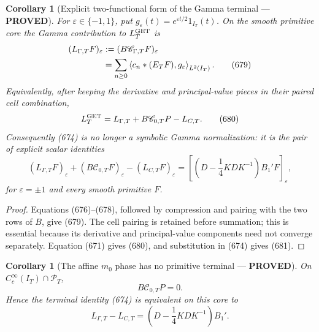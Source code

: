 \documentclass[11pt]{article}
\newtheorem{corollary}[theorem]{Corollary}
\newcommand{\PROVED}{\textcolor{green!45!black}{\textbf{PROVED}}}
\begin{document}
\begin{corollary}[Explicit two-functional form of the Gamma terminal ---
\PROVED]
For \(\varepsilon\in\{-1,1\}\), put
\(g_\varepsilon(t)=e^{\varepsilon t/2}1_{I_T}(t)\).  On the smooth
primitive core the Gamma contribution to \(L_T^{\rm GET}\) is
\begin{align}
 (L_{\Gamma,T}F)_\varepsilon
 &:=(B\mathscr C_{\Gamma,T}F)_\varepsilon\notag\\
 &=\sum_{n\ge0}
   \left\langle
    c_n*(E_TF),g_\varepsilon
   \right\rangle_{L^2(I_T)}.                         \tag{679}
\end{align}
Equivalently, after keeping the derivative and principal-value pieces in
their paired cell combination,
\begin{equation}
 L_T^{\rm GET}
 =L_{\Gamma,T}+B\mathscr C_{0,T}P-L_{C,T}.           \tag{680}
\end{equation}
Consequently (674) is no longer a symbolic Gamma normalization: it is the
pair of explicit scalar identities
\begin{equation}
 \boxed{
 (L_{\Gamma,T}F)_\varepsilon+
 (B\mathscr C_{0,T}F)_\varepsilon-
 (L_{C,T}F)_\varepsilon
 =
 \left[
 \left(D-\frac14KDK^{-1}\right)B_1'F
 \right]_\varepsilon,}                              \tag{681}
\end{equation}
for \(\varepsilon=\pm1\) and every smooth primitive \(F\).
\end{corollary}

\begin{proof}
Equations (676)--(678), followed by compression and pairing with the two
rows of \(B\), give (679).  The cell pairing is retained before summation;
this is essential because its derivative and principal-value components
need not converge separately.  Equation (671) gives (680), and substitution
in (674) gives (681).
\end{proof}

\begin{corollary}[The affine \(m_0\) phase has no primitive terminal ---
\PROVED]
On \(C_c^\infty(I_T)\cap\mathcal P_T\),
\begin{equation}
 B\mathscr C_{0,T}P=0.                               \tag{682}
\end{equation}
Hence the terminal identity (674) is equivalent on this core to
\begin{equation}
 \boxed{
 L_{\Gamma,T}-L_{C,T}
 =\left(D-\frac14KDK^{-1}\right)B_1'.}              \tag{683}
\end{equation}
\end{corollary}
\end{document}
